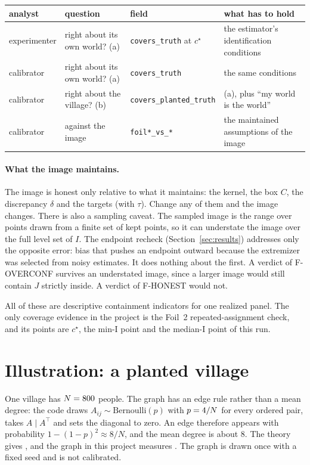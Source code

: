 \documentclass[11pt]{article}
\begin{document}
\begin{center}
\small
\begin{tabular}{@{}p{24mm}p{36mm}p{42mm}p{44mm}@{}}
\toprule
analyst & question & field & what has to hold \\
\midrule
experimenter & right about its own world? (a) & \texttt{covers\_truth} at $c^\star$ & the estimator's identification conditions \\
calibrator & right about its own world? (a) & \texttt{covers\_truth} & the same conditions \\
calibrator & right about the village? (b) & \texttt{covers\_planted\_truth} & (a), plus ``my world is the world'' \\
calibrator & against the image & \texttt{foil*\_vs\_*} & the maintained assumptions of the image \\
\bottomrule
\end{tabular}
\end{center}

\paragraph{What the image maintains.}
The image is honest only relative to what it maintains: the kernel, the
box $C$, the discrepancy $\delta$ and the targets (with $\tau$). Change
any of them and the image changes. There is also a sampling caveat. The
sampled image is the range over \ThetaSample{} points drawn from a finite
set of kept points, so it can understate the image over the full level
set of $I$. The endpoint recheck (Section~\ref{sec:results}) addresses
only the opposite error: bias that pushes an endpoint outward because
the extremizer was selected from noisy estimates. It does nothing about
the first. A verdict of F-OVERCONF survives an understated image, since
a larger image would still contain $J$ strictly inside. A verdict of
F-HONEST would not.

All of these are descriptive containment indicators for one realized
panel. The only coverage evidence in the project is the Foil~2
repeated-assignment check, and its points are $c^\star$, the min-I
point and the median-I point of this run.

\section{Illustration: a planted village}

One village has $N=800$ people. The graph has an edge rule rather than a
mean degree: the code draws $A_{ij}\sim\mathrm{Bernoulli}(p)$ with $p=4/N$ for every ordered pair, takes
$A\mid A^\top$ and sets the diagonal to zero. An edge therefore appears with
probability $1-(1-p)^2\approx 8/N$, and the mean degree is about 8. The theory gives
\MeanDegreeTheory, and the graph in this project measures \MeanDegree.
The graph is drawn once with a fixed seed and is not calibrated.
\end{document}
